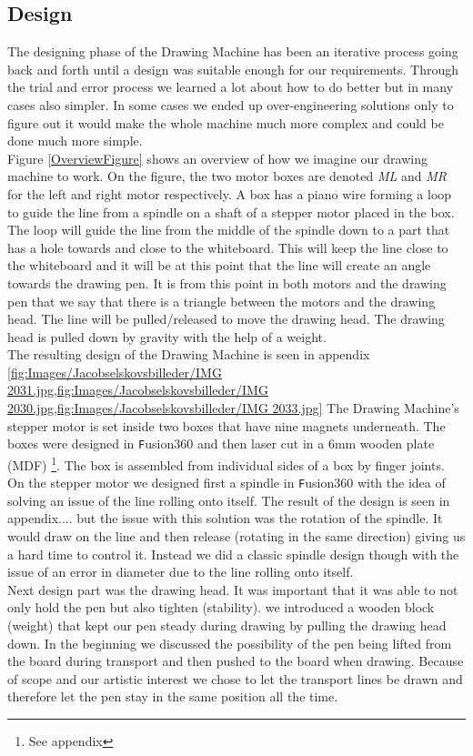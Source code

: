\subsection{Design}
The designing phase of the Drawing Machine has been an iterative process going back and forth until a design was suitable enough for our requirements. Through the trial and error process we learned a lot about how to do better but in many cases also simpler. In some cases we ended up over-engineering solutions only to figure out it would make the whole machine much more complex and could be done much more simple.\\
Figure \ref{OverviewFigure} shows an overview of how we imagine our drawing machine to work. On the figure, the two motor boxes are denoted {\it ML} and {\it MR} for the left and right motor respectively. A box has a piano wire forming a loop to guide the line from a spindle on a shaft of a stepper motor placed in the box. The loop will guide the line from the middle of the spindle down to a part that has a hole towards and close to the whiteboard.
This will keep the line close to the whiteboard and it will be at this point that the line will create an angle towards the drawing pen. It is from this point in both motors and the drawing pen that we say that there is a triangle between the motors and the drawing head. The line will be pulled/released to move the drawing head. The drawing head is pulled down by gravity with the help of a weight.\\ The resulting design of the Drawing Machine is seen in appendix \cref{fig:Images/Jacobselskovsbilleder/IMG 2031.jpg,fig:Images/Jacobselskovsbilleder/IMG 2030.jpg,fig:Images/Jacobselskovsbilleder/IMG 2033.jpg}
The Drawing Machine's stepper motor is set inside two boxes that have nine magnets underneath. The boxes were designed in {\texttt Fusion360} and then laser cut in a 6mm wooden plate (MDF) \footnote{See appendix}. The box is assembled from individual sides of a box by finger joints.   On the stepper motor we designed first a spindle in {\texttt Fusion360} with the idea of solving an issue of the line rolling onto itself. The result of the design is seen in appendix.... but the issue with this solution was the rotation of the spindle. It would draw on the line and then release (rotating in the same direction) giving us a hard time to control it. Instead we did a classic spindle design though with the issue of an error in diameter due to the line rolling onto itself.\\
Next design part was the drawing head. It was important that it was able to not only hold the pen but also tighten (stability). we introduced a wooden block (weight) that kept our pen steady during drawing by pulling the drawing head down. In the beginning we discussed the possibility of the pen being lifted from the board during transport and then pushed to the board when drawing. Because of scope and our artistic interest we chose to let the transport lines be drawn and therefore let the pen stay in the same position all the time.  
